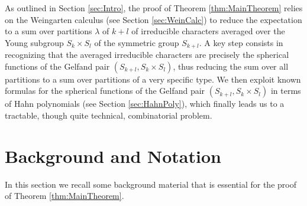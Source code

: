 \documentclass[11pt, a4paper, oneside, reqno]{amsart}
\theoremstyle{remark}
\theoremstyle{definition}
\numberwithin{equation}{section}
\begin{document}
As outlined in Section \ref{sec:Intro}, the proof of Theorem \ref{thm:MainTheorem} relies on the Weingarten calculus (see Section \ref{sec:WeinCalc}) to reduce the expectation to a sum over partitions $\lambda$ of $k+l$ of irreducible characters averaged over the Young subgroup $S_k \times S_l$ of the symmetric group $S_{k+l}$. A key step consists in recognizing that the averaged irreducible characters are precisely the spherical functions of the Gelfand pair $(S_{k+l}, S_k \times S_l)$, thus reducing the sum over all partitions to a sum over partitions of a very specific type. We then exploit known formulas for the spherical functions of the Gelfand pair $(S_{k+l}, S_k \times S_l)$ in terms of Hahn polynomials (see Section \ref{sec:HahnPoly}), which finally leads us to a tractable, though quite technical, combinatorial problem.



\section{Background and Notation}
In this section we recall some background material that is essential for the proof of Theorem \ref{thm:MainTheorem}.
\end{document}
